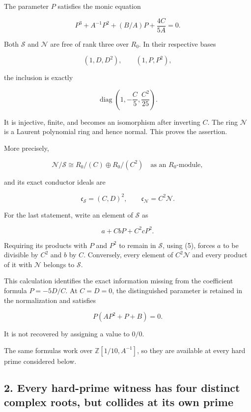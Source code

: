 The parameter \(P\) satisfies the monic equation

\[
P^3+A^{-1}P^2+(B/A)P+\frac{4C}{5A}=0.
\tag{5}
\]

Both \(\mathscr S\) and \(\mathscr N\) are free of rank three over
\(R_0\). In their respective bases

\[
(1,D,D^2),\qquad (1,P,P^2),
\]

the inclusion is exactly

\[
\boxed{
\operatorname{diag}\left(1,-\frac C5,\frac{C^2}{25}\right).
}
\tag{6}
\]

It is injective, finite, and becomes an isomorphism after inverting
\(C\). The ring \(\mathscr N\) is a Laurent polynomial ring and hence
normal. This proves the assertion.

More precisely,

\[
\boxed{
\mathscr N/\mathscr S
\cong R_0/(C)\oplus R_0/(C^2)
\quad\text{as an }R_0\text{-module},
}
\tag{7}
\]

and its exact conductor ideals are

\[
\boxed{
\mathfrak c_{\mathscr S}=(C,D)^2,
\qquad
\mathfrak c_{\mathscr N}=C^2\mathscr N.
}
\tag{8}
\]

For the last statement, write an element of \(\mathscr S\) as

\[
a+C bP+C^2cP^2.
\]

Requiring its products with \(P\) and \(P^2\) to remain in
\(\mathscr S\), using (5), forces \(a\) to be divisible by \(C^2\) and
\(b\) by \(C\). Conversely, every element of \(C^2\mathscr N\) and every
product of it with \(\mathscr N\) belongs to \(\mathscr S\).

This calculation identifies the exact information missing from the
coefficient formula \(P=-5D/C\). At \(C=D=0\), the distinguished
parameter is retained in the normalization and satisfies

\[
P(AP^2+P+B)=0.
\]

It is not recovered by assigning a value to \(0/0\).

The same formulas work over \(\mathbb Z[1/10,A^{-1}]\), so they are
available at every hard prime considered below.

\subsection{2. Every hard-prime witness has four distinct complex roots,
but collides at its own
prime}\label{every-hard-prime-witness-has-four-distinct-complex-roots-but-collides-at-its-own-prime}

